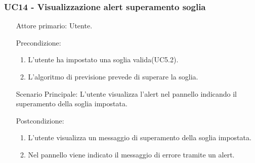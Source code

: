 \subsubsection{UC14 - Visualizzazione alert superamento soglia}
\label{sssec:uc14}
\begin{description}
	\begin{enumerate}
		\item[Attore primario:] Utente.
		\item[Precondizione:]
		\begin{enumerate}
			\item L'utente ha impostato una soglia valida(UC5.2).
			\item L'algoritmo di previsione prevede di superare la soglia.
		\end{enumerate}
		\item[Scenario Principale:] L'utente visualizza l'alert nel pannello indicando il superamento della soglia impostata.
		\item[Postcondizione:]
		\begin{enumerate}
			\item L'utente visualizza un messaggio di superamento della soglia impostata.
			\item Nel pannello viene indicato il messaggio di errore tramite un alert.
		\end{enumerate}
	\end{enumerate}
\end{description}